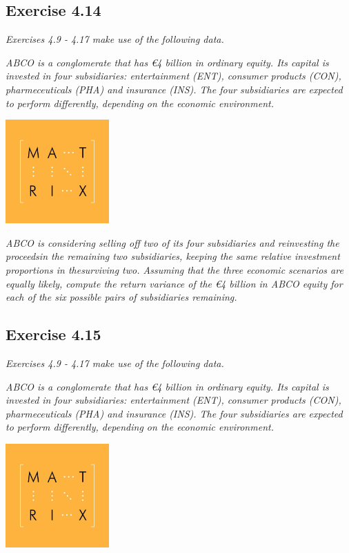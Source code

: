\documentclass[]{book}
\newcommand{\euro}{€}
\theoremstyle{definition}
\theoremstyle{definition}
\theoremstyle{remark}
\begin{document}
\subsection{Exercise 4.14}\label{exercise-4.14}

\emph{Exercises 4.9 - 4.17 make use of the following data.}
\citep[p.117]{book}

\emph{ABCO is a conglomerate that has \euro{}4 billion in ordinary
equity. Its capital is invested in four subsidiaries: entertainment
(ENT), consumer products (CON), pharmeceuticals (PHA) and insurance
(INS). The four subsidiaries are expected to perform differently,
depending on the economic environment.} \citep[p.117]{book}

\begin{center}\includegraphics[width=150px]{figures/matrix} \end{center}

\emph{ABCO is considering selling off two of its four subsidiaries and
reinvesting the proceedsin the remaining two subsidiaries, keeping the
same relative investment proportions in thesurviving two. Assuming that
the three economic scenarios are equally likely, compute the return
variance of the \euro{}4 billion in ABCO equity for each of the six
possible pairs of subsidiaries remaining.} \citep[p.118]{book}

\subsection{Exercise 4.15}\label{exercise-4.15}

\emph{Exercises 4.9 - 4.17 make use of the following data.}
\citep[p.117]{book}

\emph{ABCO is a conglomerate that has \euro{}4 billion in ordinary
equity. Its capital is invested in four subsidiaries: entertainment
(ENT), consumer products (CON), pharmeceuticals (PHA) and insurance
(INS). The four subsidiaries are expected to perform differently,
depending on the economic environment.} \citep[p.117]{book}

\begin{center}\includegraphics[width=150px]{figures/matrix} \end{center}
\end{document}
